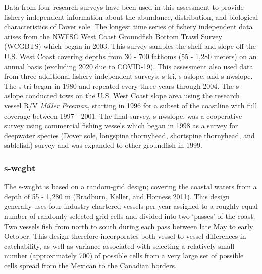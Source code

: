 \documentclass[11pt,
  english,
  a4paper,
]{article}
\begin{document}

Data from four research surveys have been used in this assessment to provide fishery-independent information about the abundance, distribution, and biological characteristics of Dover sole. The longest time series of fishery independent data arises from the NWFSC West Coast Groundfish Bottom Trawl Survey (WCGBTS) which began in 2003. This survey samples the shelf and slope off the U.S. West Coast covering depths from 30 - 700 fathoms (55 - 1,280 meters) on an annual basis (excluding 2020 due to COVID-19). This assessment also used data from three additional fishery-independent surveys: \gls{s-tri}, \gls{s-aslope}, and \gls{s-nwslope}. The \gls{s-tri} began in 1980 and repeated every three years through 2004. The \gls{s-aslope} conducted tows on the U.S. West Coast slope area using the research vessel R/V \emph{Miller Freeman}, starting in 1996 for a subset of the coastline with full coverage between 1997 - 2001. The final survey, \gls{s-nwslope}, was a cooperative survey using commercial fishing vessels which began in 1998 as a survey for deepwater species (Dover sole, longspine thornyhead, shortspine thornyhead, and sablefish) survey and was expanded to other groundfish in 1999.

\leavevmode\tagmcend\tagstructend\par


\hypertarget{nwfsc-wcgbt}{%
\subsubsection{\texorpdfstring{\acrlong{s-wcgbt}}{}}\label{nwfsc-wcgbt}}

\leavevmode\tagmcend\tagstructend


The \gls{s-wcgbt} is based on a random-grid design; covering the coastal waters from a depth of 55 - 1,280 m {(Bradburn, Keller, and Horness 2011)\leavevmode\tagmcend\tagstructend}. This design generally uses four industry-chartered vessels per year assigned to a roughly equal number of randomly selected grid cells and divided into two `passes' of the coast. Two vessels fish from north to south during each pass between late May to early October. This design therefore incorporates both vessel-to-vessel differences in catchability, as well as variance associated with selecting a relatively small number (approximately 700) of possible cells from a very large set of possible cells spread from the Mexican to the Canadian borders.
\end{document}

